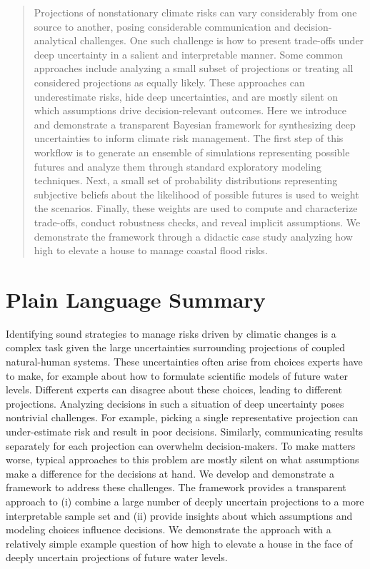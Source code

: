\documentclass{agujournal2019}
\begin{document}
\begin{abstract}
  Projections of nonstationary climate risks can vary considerably from one source to another, posing considerable communication and decision-analytical challenges.
  One such challenge is how to present trade-offs under deep uncertainty in a salient and interpretable manner.
  Some common approaches include analyzing a small subset of projections or treating all considered projections as equally likely.
  These approaches can underestimate risks, hide deep uncertainties, and are mostly silent on which assumptions drive decision-relevant outcomes.
  Here we introduce and demonstrate a transparent Bayesian framework for synthesizing deep uncertainties to inform climate risk management.
  The first step of this workflow is to generate an ensemble of simulations representing possible futures and analyze them through standard exploratory modeling techniques.
  Next, a small set of probability distributions representing subjective beliefs about the likelihood of possible futures is used to weight the scenarios.
  Finally, these weights are used to compute and characterize trade-offs, conduct robustness checks, and reveal implicit assumptions.
  We demonstrate the framework through a didactic case study analyzing how high to elevate a house to manage coastal flood risks.
\end{abstract}

\section*{Plain Language Summary}

Identifying sound strategies to manage risks driven by climatic changes is a complex task given the large uncertainties surrounding projections of  coupled natural-human systems.
These uncertainties often arise from choices experts have to make, for example about how to formulate scientific models of future water levels.
Different experts can disagree about these choices, leading to different projections.
Analyzing decisions in such a situation of deep uncertainty poses nontrivial challenges.
For example, picking a single representative projection can under-estimate risk and result in poor decisions.
Similarly, communicating results separately for each projection can overwhelm decision-makers.
To make matters worse, typical approaches to this problem are mostly silent on what assumptions make a difference for the decisions at hand.
We develop and demonstrate a framework to address these challenges.
The framework provides a transparent approach to (i) combine a large number of deeply uncertain projections to a more interpretable sample set and (ii) provide insights about which assumptions and modeling choices influence decisions.
We demonstrate the approach with a relatively simple example question of how high to elevate a house in the face of deeply uncertain projections of future water levels.
\end{document}
